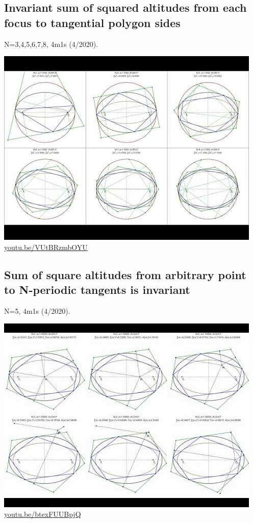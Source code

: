 \documentclass[12pt]{amsart}
\begin{document}
\subsection{Invariant sum of squared altitudes from each focus to tangential polygon sides}
\label{vid:VUtBRzmbOYU}
\noindent N=3,4,5,6,7,8, 4m1s (4/2020). 
\begin{center}\includegraphics[width=.5\textwidth]{pics/VUtBRzmbOYU.jpg} \\ 
\href{https://youtu.be/VUtBRzmbOYU}{\url{youtu.be/VUtBRzmbOYU}}\end{center}
% 

\subsection{Sum of square altitudes from arbitrary point to N-periodic tangents is invariant}
\label{vid:btexFUUBpjQ}
\noindent N=5, 4m1s (4/2020). 
\begin{center}\includegraphics[width=.5\textwidth]{pics/btexFUUBpjQ.jpg} \\ 
\href{https://youtu.be/btexFUUBpjQ}{\url{youtu.be/btexFUUBpjQ}}\end{center}
% 
\end{document}
